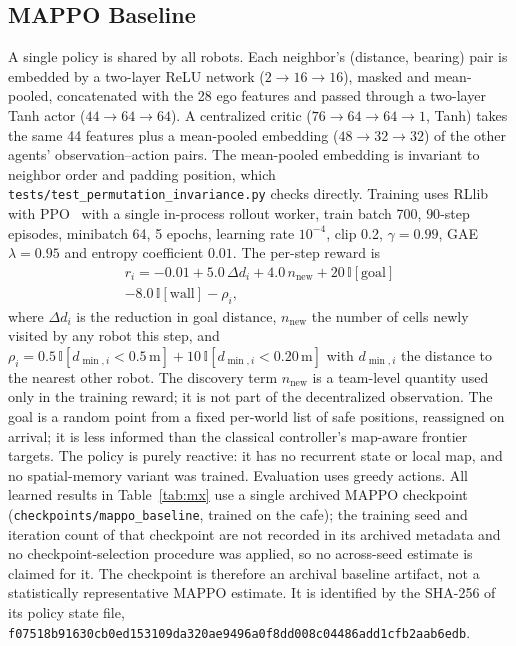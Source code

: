 \documentclass[conference]{IEEEtran}
\newcommand{\si}[1]{\mathrm{#1}}
\begin{document}
\subsection{MAPPO Baseline}
A single policy is shared by all robots. Each neighbor's (distance, bearing)
pair is embedded by a two-layer ReLU network ($2\to16\to16$), masked and
mean-pooled, concatenated with the 28 ego features and passed through a
two-layer Tanh actor ($44\to64\to64$). A centralized critic ($76\to64\to64\to1$,
Tanh) takes the same 44 features plus a mean-pooled embedding
($48\to32\to32$) of the other agents' observation--action pairs. The
mean-pooled embedding is invariant to neighbor order and padding position, which
\texttt{tests/test\_permutation\_invariance.py} checks directly. Training uses
RLlib~\cite{liang2018rllib} with PPO~\cite{schulman2017ppo} with a single in-process rollout worker,
train batch 700, $90$-step episodes, minibatch 64, 5 epochs, learning rate
$10^{-4}$, clip 0.2, $\gamma=0.99$, GAE $\lambda=0.95$ and entropy
coefficient $0.01$. The per-step reward is
\begin{multline}
r_i=-0.01+5.0\,\Delta d_i+4.0\,n_{\text{new}}+20\,\mathbb{I}[\text{goal}]\\
-8.0\,\mathbb{I}[\text{wall}]-\rho_i,
\end{multline}
where $\Delta d_i$ is the reduction in goal distance, $n_{\text{new}}$ the number
of cells newly visited by any robot this step, and $\rho_i=0.5\,\mathbb{I}[d_{\min,i}<0.5\,\si{m}]+10\,\mathbb{I}[d_{\min,i}<0.20\,\si{m}]$ with $d_{\min,i}$ the distance to the nearest other robot. The discovery term $n_{\text{new}}$ is a team-level quantity used only in the training reward; it is not part of the decentralized observation. The goal is a random
point from a fixed per-world list of safe positions, reassigned on arrival; it
is less informed than the classical controller's map-aware frontier targets. The policy is purely reactive: it has no recurrent state or local map, and no spatial-memory variant was trained.
Evaluation uses greedy actions. All learned results in Table~\ref{tab:mx} use a single archived MAPPO checkpoint (\texttt{checkpoints/mappo\_baseline}, trained on the cafe); the training seed and iteration count of that checkpoint are not recorded in its archived metadata and no checkpoint-selection procedure was applied, so no across-seed estimate is claimed for it. The checkpoint is therefore an archival baseline artifact, not a statistically representative MAPPO estimate. It is identified by the SHA-256 of its policy state file, \texttt{f07518b9\allowbreak 1630cb0e\allowbreak d153109d\allowbreak a320ae94\allowbreak 96a0f8dd\allowbreak 008c0448\allowbreak 6add1cfb\allowbreak 2aab6edb}. 
\end{document}
